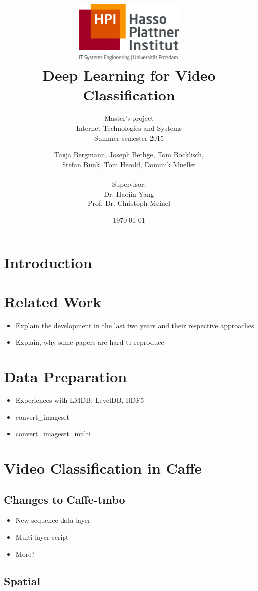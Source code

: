 \documentclass[a4paper,12pt,headsepline,pagesize,bibtotoc,titlepage]{scrartcl}
\title{
	\includegraphics*[width=0.4\textwidth]{images/hpi_logo.png}\\
	\vspace{24pt}
	Deep Learning for Video Classification
}
\subtitle{
	Master’s project\\
	Internet Technologies and Systems\\
	Summer semester 2015
}
\author{
	Tanja Bergmann, Joseph Bethge, Tom Bocklisch, \\
	Stefan Bunk, Tom Herold, Dominik Mueller \\ \\[12pt]
	Supervisor:\\
	Dr. Haojin Yang\\
	Prof. Dr. Christoph Meinel
}
\date{\today}
\begin{document}
\maketitle
\tableofcontents
\newpage

\section{Introduction}
\section{Related Work}
\begin{itemize}
	\item Explain the development in the last two years and their respective approaches
	\item Explain, why some papers are hard to reproduce
\end{itemize}

\section{Data Preparation}

\begin{itemize}
	\item Experiences with LMDB, LevelDB, HDF5
	\item convert\_imageset
	\item convert\_imageset\_multi
\end{itemize}

\section{Video Classification in Caffe}
\subsection{Changes to Caffe-tmbo}

\begin{itemize}
	\item New sequence data layer
	\item Multi-layer script
	\item More?
\end{itemize}

\subsection{Spatial}
\end{document}
